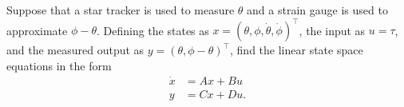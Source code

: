 
Suppose that a star tracker is used to measure $\theta$ and a strain gauge is used to approximate $\phi-\theta$.  
Defining the states as $x=(\theta,\phi,\dot{\theta},\dot{\phi})^{\top}$, the input as $u=\tau$, and the measured output as $y=(\theta,\phi-\theta)^{\top}$, find the linear state space equations in the form
\begin{align*}
	\dot{x} &= Ax + Bu \\
	y &= Cx + Du.
\end{align*} 